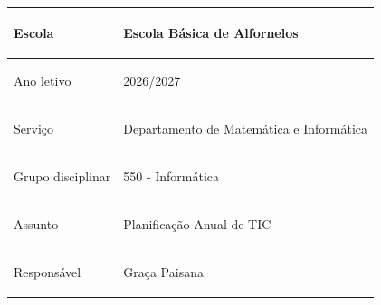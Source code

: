 \documentclass[11pt,a4paper]{article}
\begin{document}
\CabecalhoAlfornelos


\renewcommand{\arraystretch}{1.2}

\begin{tabularx}{\textwidth}{|>{\bfseries\raggedright\arraybackslash}p{3.5cm}|X|}
\hline
Escola & Escola Básica de Alfornelos \\
\hline
Ano letivo & 2026/2027 \\
\hline
Serviço & Departamento de Matemática e Informática \\
\hline
Grupo disciplinar & 550 - Informática \\
\hline
Assunto & Planificação Anual de TIC \\
\hline
Responsável & Graça Paisana \\
\hline
\end{tabularx}
\end{document}
